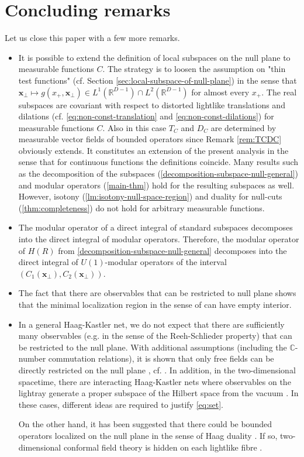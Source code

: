 \documentclass[12pt]{article}
\def\RR{{\mathbb R}}
\def\CC{{\mathbb C}}
\def\tx{\pmb{x}}
\theoremstyle{remark}
\begin{document}
\section{Concluding remarks}\label{concluding}
Let us close this paper with a few more remarks.
\begin{itemize}
 \item
 It is possible to extend the definition of local subspaces on the null plane to measurable functions $C$. The strategy is to loosen the assumption on "thin test functions" (cf.\! Section \ref{sec:local-subspace-of-null-plane}) in the sense that $\tx_\perp \mapsto g(x_+,\tx_\perp) \in L^1(\RR^{D-1})\cap L^2(\RR^{D-1})$ for almost every $x_+$. The real subspaces are covariant with respect to distorted lightlike translations and dilations (cf.\! \eqref{eq:non-const-translation} and \eqref{eq:non-const-dilations}) for measurable functions $C$. Also in  this case $T_C$ and $D_C$ are determined by measurable vector fields of bounded operators since Remark \ref{rem:TCDC} obviously extends. It constitutes an extension of the present analysis in the sense that for continuous functions the definitions coincide.
Many results such as the decomposition of the subspaces (\autoref{decomposition-subspace-null-general}) and modular operators (\autoref{main-thm}) hold for the resulting subspaces as well. However, isotony (\autoref{lm:isotony-null-space-region}) and duality for null-cuts (\autoref{thm:completeness}) do not hold for arbitrary measurable functions.
\item 
The modular operator of a direct integral of standard subspaces decomposes into the direct integral of modular operators.
Therefore, the modular operator of $H(R)$ from \autoref{decomposition-subspace-null-general} decomposes into the direct integral of $U(1)$-modular operators of the interval $(C_1(\tx_\perp),C_2(\tx_\perp))$.
\item The fact that there are observables that can be restricted to null plane shows
that the minimal localization region in the sense of \cite{Kuckert00} can have empty interior.
\item In a general Haag-Kastler net, we do not expect that there are sufficiently many observables
(e.g.\! in the sense of the Reeh-Schlieder property) that can be restricted to the null plane.
With additional assumptions (including the $\CC$-number commutation relations),
it is shown that only free fields can be directly restricted on the null plane \cite{Driessler76-2},
cf.\! \cite[Section 5]{Wall12} \cite[A]{BCFM15}.
In addition, in the two-dimensional spacetime, there are interacting Haag-Kastler nets \cite{Tanimoto14-1}
where observables on the lightray generate a proper subspace of the Hilbert space from the vacuum
\cite[Section 5.3, Trivial examples]{BT15}.
In these cases, different ideas are required to justify \eqref{eq:set}.

On the other hand, it has been suggested that there could be bounded operators localized on the null plane
in the sense of Haag duality \cite{Schroer05}. If so, two-dimensional conformal field theory is hidden
on each lightlike fibre \cite{BLM11}.
\end{itemize}
\end{document}
